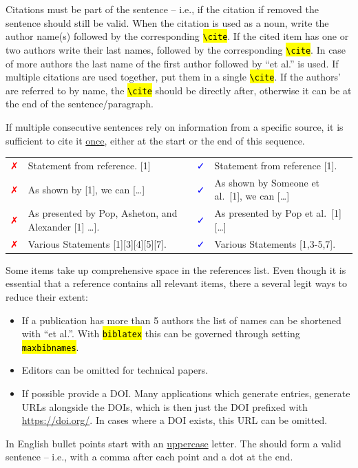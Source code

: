 \documentclass[10pt, a4paper]{article}
\newcommand{\code}[1]{\texttt{\hl{#1}}}
\newcommand{\genericbox}[4]{%
\footnotesize
\begin{tcolorbox}[width=.95\textwidth,colback={#1},title={#3},colbacktitle={#2},coltitle=black]
#4
\end{tcolorbox}
\normalsize
}
\newcommand{\examplesbox}[1]{%
\genericbox{blue!10!white}{blue!30!white}{\faHandORight\ Examples}{#1}
}
\newcommand{\protipbox}[1]{%
\genericbox{yellow!10!white}{yellow!30!white}{\faLightbulbO\ Pro Tip}{#1}
}
\newcommand{\exampleFalse}{%
    \textcolor{red}{\faClose}
}
\newcommand{\exampleCorrect}{%
    \textcolor{blue}{\faCheck}
}
\begin{document}
\begin{enumdescript}
    \item [Citations] Citations must be part of the sentence -- i.e., if the citation if removed the sentence should still be valid. When the citation is used as a noun, write the author name(s) followed by the corresponding \code{\textbackslash cite}. 
    If the cited item has one or two authors write their last names, followed by the corresponding \code{\textbackslash cite}. 
    In case of more authors the last name of the first author followed by ``et al.'' is used. 
    If multiple citations are used together, put them in a single \code{\textbackslash cite}.
    If the authors' are referred to by name, the \code{\textbackslash cite} should be directly after, otherwise it can be at the end of the sentence/paragraph.

    If multiple consecutive sentences rely on information from a specific source, it is sufficient to cite it \uline{once}, either at the start or the end of this sequence.
    \examplesbox{
       \begin{tabularx}{\textwidth}{p{4mm}@{}X|p{4mm}@{}X}
           \exampleFalse 
           & Statement from reference. [1]
           & \exampleCorrect 
           & Statement from reference [1]. \\
           \exampleFalse
           & As shown by [1], we can [\dots]
           & \exampleCorrect
           & As shown by Someone et al.~[1], we can [\dots] \\
          \exampleFalse 
           & As presented by Pop, Asheton, and Alexander [1] \dots].
           & \exampleCorrect 
           & As presented by Pop et al.~[1] [\dots] \\
           \exampleFalse 
           & Various Statements [1][3][4][5][7]. & \exampleCorrect 
           & Various Statements [1,3-5,7]. \\ 
       \end{tabularx}
    }
    \protipbox{Some items take up comprehensive space in the references list. Even though it is essential that a reference contains all relevant items, there a several legit ways to reduce their extent:
    \begin{itemize}
        \item If a publication has more than 5 authors the list of names can be shortened with ``et al.''. With \code{biblatex} this can be governed through setting \code{maxbibnames}.
        \item Editors can be omitted for technical papers. 
        \item If possible provide a DOI. Many applications which generate entries, generate URLs alongside the DOIs, which is then just the DOI prefixed with \url{https://doi.org/}. In cases where a DOI exists, this URL can be omitted.
    \end{itemize}
    }
    \item [Enumerations/Bullet Lists] In English bullet points start with an \uline{uppercase} letter. 
    The should form a valid sentence -- i.e., with a comma after each point and a dot at the end. 
\end{enumdescript}
\end{document}
